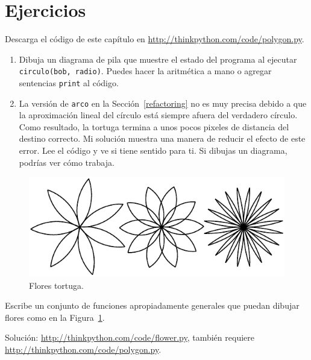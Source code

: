 \documentclass[10pt]{book}
\begin{document}
\section{Ejercicios}

\begin{exercise}

Descarga el código de este capítulo en
\url{http://thinkpython.com/code/polygon.py}.

\begin{enumerate}

\item Dibuja un diagrama de pila que muestre el estado del programa
al ejecutar {\tt circulo(bob, radio)}.  Puedes hacer la
aritmética a mano o agregar sentencias {\tt print} al código.

\item La versión de {\tt arco} en la Sección~\ref{refactoring} no es
muy precisa debido a que la aproximación lineal del
círculo está siempre afuera del verdadero círculo.  Como resultado,
la tortuga termina a unos pocos pixeles de distancia del destino
correcto.  Mi solución muestra una manera de reducir
el efecto de este error.  Lee el código y ve si
tiene sentido para ti.  Si dibujas un diagrama, podrías ver cómo trabaja.

\end{enumerate}

\end{exercise}

\begin{figure}
\centerline
{\includegraphics[scale=0.8]{figs/flowers.pdf}}
\caption{Flores tortuga.}
\label{fig.flowers}
\end{figure}

\begin{exercise}

Escribe un conjunto de funciones apropiadamente generales que
puedan dibujar flores como en la Figura~\ref{fig.flowers}.

Solución: \url{http://thinkpython.com/code/flower.py},
también requiere \url{http://thinkpython.com/code/polygon.py}.

\end{exercise}
\end{document}
